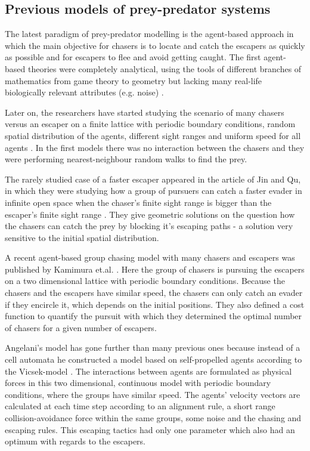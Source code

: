 \documentclass[12pt,a4paper,final]{iopart}
\begin{document}
\subsection{Previous models of prey-predator systems}

The latest paradigm of prey-predator modelling is the agent-based approach in which the main objective for chasers is to locate and catch the escapers as quickly as possible and for escapers to flee and avoid getting caught. The first agent-based theories were completely analytical, using the tools of different branches of mathematics from game theory to geometry but lacking many real-life biologically relevant attributes (e.g. noise) \cite{howland1974optimal, weihs1984optimal}.

Later on, the researchers have started studying the scenario of many chasers versus an escaper on a finite lattice with periodic boundary conditions, random spatial distribution of the agents, different sight ranges and uniform speed for all agents \cite{oshanin2009survival}. In the first models there was no interaction between the chasers and they were performing nearest-neighbour random walks to find the prey.

The rarely studied case of a faster escaper appeared in the article of Jin and Qu, in which they were studying how a group of pursuers can catch a faster evader in infinite open space when the chaser's finite sight range is bigger than the escaper's finite sight range \cite{jin2010pursuit}. They give geometric solutions on the question how the chasers can catch the prey by blocking it's escaping paths - a solution very sensitive to the initial spatial distribution. 

A recent agent-based group chasing model with many chasers and escapers was published by Kamimura et.al. \cite{kamimura2010group, vicsek2010statistical}. Here the group of chasers is pursuing the escapers on a two dimensional lattice with periodic boundary conditions. Because the chasers and the escapers have similar speed, the chasers can only catch an evader if they encircle it, which depends on the initial positions. They also defined a cost function to quantify the pursuit with which they determined the optimal number of chasers for a given number of escapers. 

Angelani's model has gone further than many previous ones because instead of a cell automata he constructed a model based on self-propelled agents according to the Vicsek-model \cite{angelani2012collective, vicsek1995novel}. The interactions between agents are formulated as physical forces in this two dimensional, continuous model with periodic boundary conditions, where the groups have similar speed. The agents' velocity vectors are calculated at each time step according to an alignment rule, a short range collision-avoidance force within the same groups, some noise and the chasing and escaping rules. This escaping tactics had only one parameter which also had an optimum with regards to the escapers. 
\end{document}
